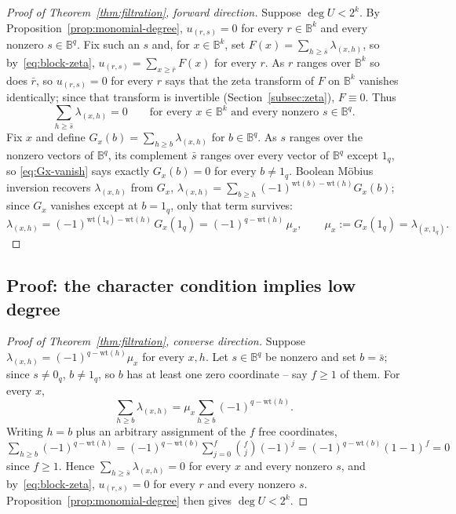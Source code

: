 \documentclass[preprint,3p,12pt,numbers]{elsarticle}
\theoremstyle{definition}
\theoremstyle{remark}
\newcommand{\wt}{\mathrm{wt}}
\begin{document}
\begin{proof}[Proof of Theorem~\ref{thm:filtration}, forward direction]
Suppose $\deg U < 2^k$. By Proposition~\ref{prop:monomial-degree},
$u_{(r,s)}=0$ for every $r \in \mathbb{B}^k$ and every nonzero
$s \in \mathbb{B}^{q}$. Fix such an $s$ and, for $x \in \mathbb{B}^k$, set
$F(x) = \sum_{h \geq \bar s} \lambda_{(x,h)}$, so by~\eqref{eq:block-zeta},
$u_{(r,s)} = \sum_{x \geq \bar r} F(x)$ for every $r$. As $r$ ranges over
$\mathbb{B}^k$ so does $\bar r$, so $u_{(r,s)}=0$ for every $r$ says that
the zeta transform of $F$ on $\mathbb{B}^k$ vanishes identically; since
that transform is invertible (Section~\ref{subsec:zeta}), $F \equiv 0$.
Thus
\begin{equation}
\label{eq:Gx-vanish}
  \sum_{h \geq \bar s} \lambda_{(x,h)} = 0
  \qquad \text{for every } x \in \mathbb{B}^k
  \text{ and every nonzero } s \in \mathbb{B}^{q} .
\end{equation}
Fix $x$ and define $G_x(b) = \sum_{h \geq b} \lambda_{(x,h)}$ for
$b \in \mathbb{B}^{q}$. As $s$ ranges over the nonzero vectors of
$\mathbb{B}^{q}$, its complement $\bar s$ ranges over every vector of
$\mathbb{B}^{q}$ except $1_{q}$, so \eqref{eq:Gx-vanish} says exactly
$G_x(b)=0$ for every $b \neq 1_{q}$. Boolean M\"obius inversion recovers
$\lambda_{(x,h)}$ from $G_x$,
$\lambda_{(x,h)} = \sum_{b \geq h}(-1)^{\wt(b)-\wt(h)} G_x(b)$; since $G_x$
vanishes except at $b=1_{q}$, only that term survives:
\[
  \lambda_{(x,h)} = (-1)^{\wt(1_{q})-\wt(h)}\, G_x(1_{q})
  = (-1)^{q-\wt(h)}\, \mu_x , \qquad
  \mu_x := G_x(1_{q}) = \lambda_{(x,1_{q})} .
\]
\end{proof}

\subsection{Proof: the character condition implies low degree}
\label{subsec:proof-converse}

\begin{proof}[Proof of Theorem~\ref{thm:filtration}, converse direction]
Suppose $\lambda_{(x,h)} = (-1)^{q-\wt(h)}\mu_x$ for every $x,h$. Let
$s \in \mathbb{B}^{q}$ be nonzero and set $b=\bar s$; since $s \neq 0_{q}$,
$b \neq 1_{q}$, so $b$ has at least one zero coordinate -- say
$f \geq 1$ of them. For every $x$,
\[
  \sum_{h \geq b} \lambda_{(x,h)} = \mu_x \sum_{h \geq b} (-1)^{q-\wt(h)} .
\]
Writing $h=b$ plus an arbitrary assignment of the $f$ free coordinates,
$\sum_{h \geq b}(-1)^{q-\wt(h)} = (-1)^{q-\wt(b)}\sum_{j=0}^{f}\binom{f}{j}
(-1)^{j} = (-1)^{q-\wt(b)}(1-1)^{f} = 0$ since $f \geq 1$. Hence
$\sum_{h \geq \bar s}\lambda_{(x,h)}=0$ for every $x$ and every nonzero
$s$, and by~\eqref{eq:block-zeta}, $u_{(r,s)}=0$ for every $r$ and every
nonzero $s$. Proposition~\ref{prop:monomial-degree} then gives
$\deg U < 2^k$.
\end{proof}
\end{document}
